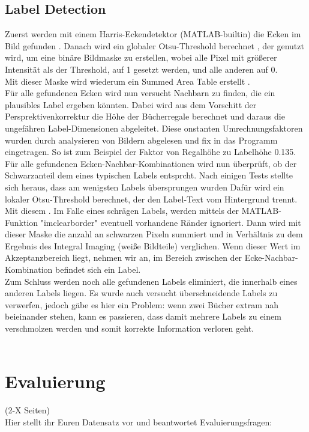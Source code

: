 \documentclass[paper=A4, deutsch]{scrartcl}
\begin{document}
\subsection{Label Detection}
Zuerst werden mit einem Harris-Eckendetektor (MATLAB-builtin) die Ecken im Bild gefunden \cite{harris}. Danach wird ein globaler Otsu-Threshold berechnet \cite{otsu}, der genutzt wird, um eine binäre Bildmaske zu erstellen, wobei alle Pixel mit größerer Intensität als der Threshold, auf 1 gesetzt werden, und alle anderen auf 0.\\
Mit dieser Maske wird wiederum ein Summed Area Table erstellt \cite{integralimg}.\\
Für alle gefundenen Ecken wird nun versucht Nachbarn zu finden, die ein plausibles Label ergeben könnten. Dabei wird aus dem Vorschitt der Persprektivenkorrektur die Höhe der Bücherregale berechnet und daraus die ungefähren Label-Dimensionen abgeleitet. Diese onstanten Umrechnungsfaktoren wurden durch analysieren von Bildern abgelesen und fix in das Programm eingetragen. So ist zum Beispiel der Faktor von Regalhöhe zu Labelhöhe 0.135.\\
Für alle gefundenen Ecken-Nachbar-Kombinationen wird nun überprüft, ob der Schwarzanteil dem eines typischen Labels entsprcht. Nach einigen Tests stellte sich heraus, dass am wenigsten Labels übersprungen wurden  Dafür wird ein lokaler Otsu-Threshold berechnet, der den Label-Text vom Hintergrund trennt. Mit diesem . Im Falle eines schrägen Labels, werden mittels der MATLAB-Funktion "imclearborder" eventuell vorhandene Ränder ignoriert. Dann wird mit dieser Maske die anzahl an schwarzen Pixeln summiert und in Verhältnis zu dem Ergebnis des Integral Imaging (weiße Bildteile) verglichen. Wenn dieser Wert im Akzeptanzbereich liegt, nehmen wir an, im Bereich zwischen der Ecke-Nachbar-Kombination befindet sich ein Label.\\
Zum Schluss werden noch alle gefundenen Labels eliminiert, die innerhalb eines anderen Labels liegen. Es wurde auch versucht überschneidende Labels zu verwerfen, jedoch gäbe es hier ein Problem: wenn zwei Bücher extram nah beieinander stehen, kann es passieren, dass damit mehrere Labels zu einem verschmolzen werden und somit korrekte Information verloren geht.
\\
\\

\section{Evaluierung}
(2-X Seiten)\\
Hier stellt ihr Euren Datensatz vor und beantwortet Evaluierungsfragen:\\
\end{document}
